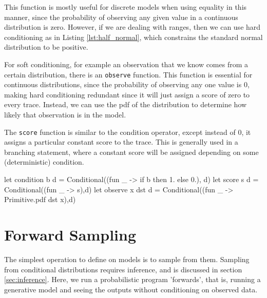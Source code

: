 \documentclass[sigconf]{acmart}
\begin{document}
This function is mostly useful for discrete models when using equality in this manner, since the probability of observing any given value in a continuous distribution is zero. However, if we are dealing with ranges, then we can use hard conditioning as in Listing \ref{lst:half_normal}, which constrains the standard normal distribution to be positive.

\begin{figure*}[!htb]
  \begin{minipage}{0.5\textwidth}
    \label{lst:dice}
  \end{minipage}
  \begin{minipage}{0.5\textwidth}
    \label{lst:half_normal}
  \end{minipage}
\end{figure*}

For soft conditioning, for example an observation that we know comes from a certain distribution, there is an \texttt{observe} function. This function is essential for continuous distributions, since the probability of observing any one value is 0, making hard conditioning redundant since it will just assign a score of zero to every trace. Instead, we can use the pdf of the distribution to determine how likely that observation is in the model.

The \texttt{score} function is similar to the condition operator, except instead of 0, it assigns a particular constant score to the trace. This is generally used in a branching statement, where a constant score will be assigned depending on some (deterministic) condition.

\begin{listing}[!htb]
  \centering
  \begin{ocamlcode-in}
    let condition b d = Conditional((fun _ -> if b then 1. else 0.), d)
    let score s d = Conditional((fun _ -> s),d)
    let observe x dst d = Conditional((fun _ -> Primitive.pdf dst x),d)
  \end{ocamlcode-in}
  \caption{The definitions of the different conditioning operators}
  \label{lst:cond}
\end{listing}

\section{Forward Sampling}
The simplest operation to define on models is to sample from them. Sampling from conditional distributions requires inference, and is discussed in section \ref{sec:inference}. Here, we run a probabilistic program 'forwards', that is, running a generative model and seeing the outputs without conditioning on observed data.
\end{document}
